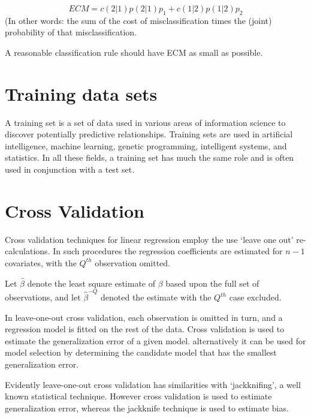 \documentclass[]{report}
\begin{document}
\[ECM = c(2|1)p(2|1)p_1 + c(1|2)p(1|2)p_2\]
(In other words: the sum of the cost of misclassification times the (joint) probability of that misclassification.

A reasonable classification rule should have ECM as small as possible.







\section{Training data sets}

A training set is a set of data used in various areas of information science to discover potentially predictive relationships. Training sets are used in artificial intelligence, machine learning, genetic programming, intelligent systems, and statistics. In all these fields, a training set has much the same role and is often used in conjunction with a test set.

\newpage
\section{Cross Validation} %


Cross validation techniques for linear regression employ the use `leave one out' re-calculations. In such procedures the regression coefficients are estimated for $n-1$ covariates, with the $Q^{th}$ observation omitted.


Let $\hat{\beta}$ denote the least square estimate of $\beta$ based upon the full set of observations, and let
$\hat{\beta}^{-Q}$ denoted the estimate with the $Q^{th}$ case
excluded.




In leave-one-out cross validation, each observation is omitted in turn, and a regression model is fitted on the rest of the data. Cross validation is used to estimate the generalization error of a given model. alternatively it can be used for model selection by determining the candidate model that has the smallest generalization error.




Evidently leave-one-out cross validation has similarities with `jackknifing', a well known statistical technique. However cross validation is used to estimate generalization error, whereas the jackknife technique is used to estimate bias.
\end{document}
